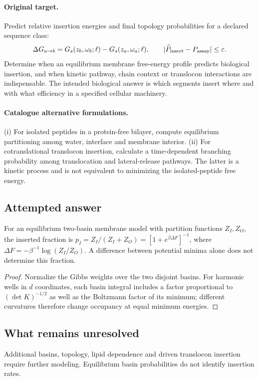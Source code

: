 \documentclass[11pt]{article}
\begin{document}
\paragraph{Original target.}
Predict relative insertion energies and final topology probabilities for a declared sequence class:
\[\Delta G_{a\to b}=G_s(z_b,\omega_b;\ell)-G_s(z_a,\omega_a;\ell),\qquad |\widehat P_{\rm insert}-P_{\rm assay}|\le\varepsilon.\]
Determine when an equilibrium membrane free-energy profile predicts biological insertion, and when kinetic pathway, chain context or translocon interactions are indispensable. The intended biological answer is which segments insert where and with what efficiency in a specified cellular machinery.
\paragraph{Catalogue alternative formulations.}
(i) For isolated peptides in a protein-free bilayer, compute equilibrium partitioning among water, interface and membrane interior. (ii) For cotranslational translocon insertion, calculate a time-dependent branching probability among translocation and lateral-release pathways. The latter is a kinetic process and is not equivalent to minimizing the isolated-peptide free energy.
\subsection{Attempted answer}
\begin{proposition}
For an equilibrium two-basin membrane model with partition functions $Z_I,Z_O$, the inserted fraction is $p_I=Z_I/(Z_I+Z_O)=[1+e^{\beta\Delta F}]^{-1}$, where $\Delta F=-\beta^{-1}\log(Z_I/Z_O)$. A difference between potential minima alone does not determine this fraction.
\end{proposition}
\begin{proof}
Normalize the Gibbs weights over the two disjoint basins. For harmonic wells in $d$ coordinates, each basin integral includes a factor proportional to $(\det K)^{-1/2}$ as well as the Boltzmann factor of its minimum; different curvatures therefore change occupancy at equal minimum energies.
\end{proof}
\subsection{What remains unresolved}
Additional basins, topology, lipid dependence and driven translocon insertion require further modeling. Equilibrium basin probabilities do not identify insertion rates.
\end{document}
